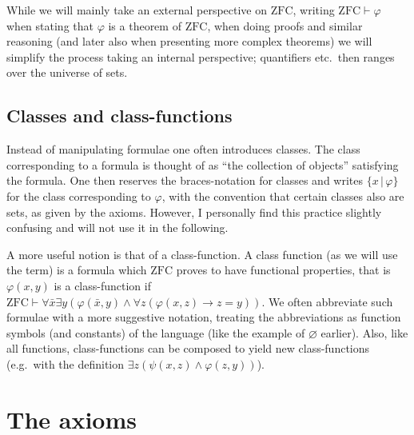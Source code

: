 \documentclass{scrartcl}
\theoremstyle{definition}
\theoremstyle{plain}
\theoremstyle{remark}
\newcommand{\ZFC}{\ensuremath{\mathrm{ZFC}}}
\newcommand{\limp}{\rightarrow}
\newcommand{\sep}{\,|\,}
\begin{document}
While we will mainly take an external perspective on $\ZFC$, writing $\ZFC \vdash \varphi$ when stating that $\varphi$ is a theorem of $\ZFC$, when doing proofs and similar reasoning (and later also when presenting more complex theorems) we will simplify the process taking an internal perspective; quantifiers etc.~then ranges over the universe of sets.

\subsection{Classes and class-functions}
\label{subsec:class}

Instead of manipulating formulae one often introduces classes. The class corresponding to a formula is thought of as ``the collection of objects'' satisfying the formula. One then reserves the braces-notation for classes and writes $\{x \sep \varphi\}$ for the class corresponding to $\varphi$, with the convention that certain classes also are sets, as given by the axioms. However, I personally find this practice slightly confusing and will not use it in the following.

A more useful notion is that of a class-function. A class function (as we will use the term) is a formula which $\ZFC$ proves to have functional properties, that is $\varphi(x,y)$ is a class-function if $\ZFC \vdash \forall \bar{x} \exists y (\varphi(\bar{x},y) \land \forall z (\varphi(x,z) \limp z = y))$. We often abbreviate such formulae with a more suggestive notation, treating the abbreviations as function symbols (and constants) of the language (like the example of $\varnothing$ earlier). Also, like all functions, class-functions can be composed to yield new class-functions (e.g.~with the definition $\exists z (\psi(x,z) \land \varphi(z,y))$).

\pagebreak

\section{The axioms}
\label{sec:axioms}
\end{document}
